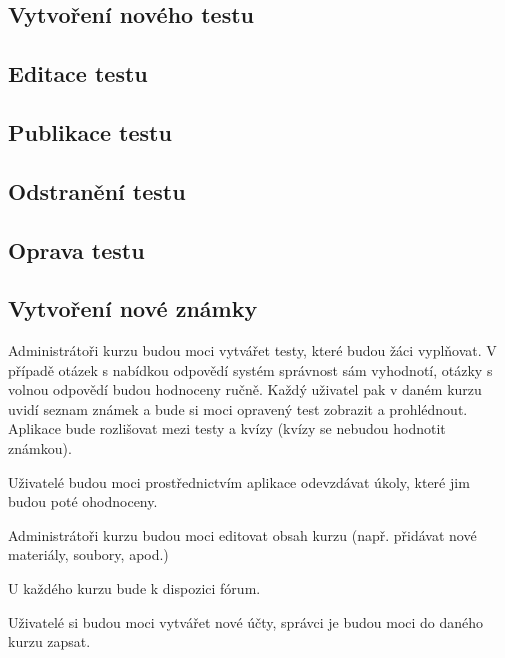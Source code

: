 \subsection{Vytvoření nového testu}

\subsection{Editace testu}

\subsection{Publikace testu}

\subsection{Odstranění testu}

\subsection{Oprava testu}

\subsection{Vytvoření nové známky}

Administrátoři kurzu budou moci vytvářet testy, které budou žáci vyplňovat. V případě otázek s nabídkou odpovědí systém správnost sám vyhodnotí, otázky s volnou odpovědí budou hodnoceny ručně. Každý uživatel pak v daném kurzu uvidí seznam známek a bude si moci opravený test zobrazit a prohlédnout. Aplikace bude rozlišovat mezi testy a kvízy (kvízy se nebudou hodnotit známkou).

Uživatelé budou moci prostřednictvím aplikace odevzdávat úkoly, které jim budou poté ohodnoceny.

Administrátoři kurzu budou moci editovat obsah kurzu (např. přidávat nové materiály, soubory, apod.) 

U každého kurzu bude k dispozici fórum. 

Uživatelé si budou moci vytvářet nové účty, správci je budou moci do daného kurzu zapsat.
